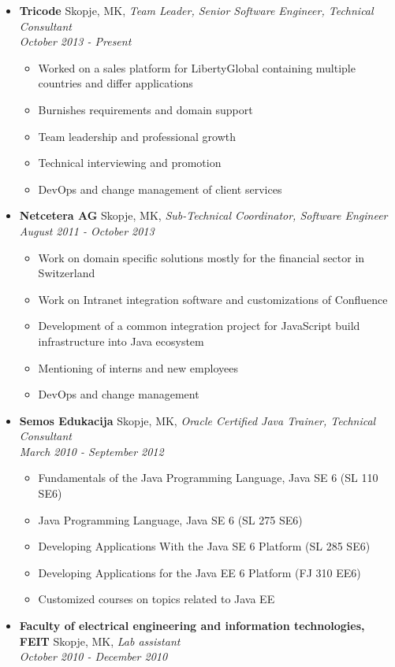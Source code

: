 \documentclass[letterpaper,11pt]{article}
\newcommand{\resitem}[1]{\item #1 \vspace{-2pt}}
\newcommand{\ressubheading}[4]{
  \textbf{#1}  #2,
  \textit{#3}\\ \textit{#4}\\
}
\begin{document}

\begin{itemize}

\item []  
\ressubheading{Tricode}{Skopje, MK}{Team Leader, Senior Software Engineer, Technical Consultant}{October 2013 - Present}
	\begin{itemize}
      \resitem{ Worked on a sales platform for LibertyGlobal containing  multiple countries and differ applications}
      \resitem{ Burnishes requirements and domain support}     
      \resitem{ Team leadership and professional growth}
      \resitem{ Technical interviewing and promotion }
      \resitem{ DevOps and change management of client services}
	\end{itemize}


\item []  
\ressubheading{Netcetera AG}{Skopje, MK}{Sub-Technical Coordinator, Software Engineer}{August 2011 - October 2013}
	\begin{itemize}
      \resitem{ Work on domain specific solutions mostly for the financial sector in Switzerland}
      \resitem{ Work on Intranet integration software and customizations of Confluence}     
      \resitem{ Development of a common integration project for JavaScript build infrastructure into Java ecosystem}
      \resitem{ Mentioning of interns and new employees }
      \resitem{ DevOps and change management}
	\end{itemize}

\item []

	\ressubheading{Semos Edukacija }{Skopje, MK}{ Oracle Certified Java Trainer, Technical Consultant }{March 2010 - September 2012}

	\begin{itemize}
 
      \resitem{Fundamentals of the Java Programming Language, Java SE 6 (SL 110 SE6) }
      \resitem{Java Programming Language, Java SE 6 (SL 275 SE6) }
      \resitem{Developing Applications With the Java SE 6 Platform (SL 285 SE6)}
      \resitem{Developing Applications for the Java EE 6 Platform (FJ 310 EE6)}
      \resitem{Customized courses on topics related to Java EE}

	\end{itemize}
	
\item []

	\ressubheading{Faculty of electrical engineering and information technologies, FEIT }{Skopje, MK}{Lab assistant}{October 2010 - December 2010}


\end{itemize}
\end{document}
